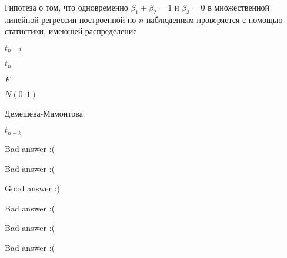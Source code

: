 
\begin{question}
Гипотеза о том, что одновременно \(\beta_1 + \beta_2 =1\) и \(\beta_3=0\)
в множественной линейной регрессии построенной по \(n\) наблюдениям
проверяется с помощью статистики, имеющей распределение
\begin{answerlist}
  \item \(t_{n-2}\)
  \item \(t_n\)
  \item \(F\)
  \item \(N(0;1)\)
  \item Демешева-Мамонтова
  \item \(t_{n-k}\)
\end{answerlist}
\end{question}

\begin{solution}
\begin{answerlist}
  \item Bad answer :(
  \item Bad answer :(
  \item Good answer :)
  \item Bad answer :(
  \item Bad answer :(
  \item Bad answer :(
\end{answerlist}
\end{solution}

